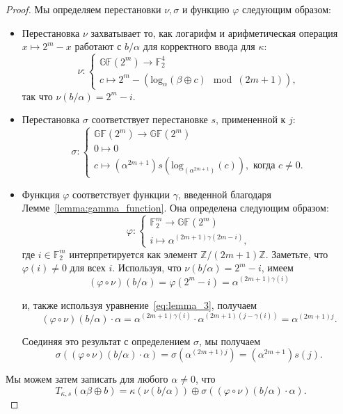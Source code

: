 \begin{proof}
Мы определяем перестановки \(\nu, \sigma\) и функцию \(\varphi\) следующим образом:

\begin{itemize}
  \item Перестановка \(\nu\) захватывает то, как логарифм и арифметическая операция \(x \mapsto 2^m - x\) работают с \(b/\alpha\) для корректного ввода для \(\kappa\):
  \[
  \nu :
  \begin{cases}
  \mathbb{GF}(2^m) \to \mathbb{F}^4_2 \\
  c \mapsto 2^m - (\mathrm{log}_{\alpha}(\beta \oplus c) \mod (2m + 1)),
  \end{cases}
  \]
  так что \(\nu(b/\alpha) = 2^m - i\).

  \item Перестановка \(\sigma\) соответствует перестановке \(s\), примененной к \(j\):
  \[
  \sigma :
  \begin{cases}
  \mathbb{GF}(2^m) \to \mathbb{GF}(2^m) \\
  0 \mapsto 0 \\
  c \mapsto (\alpha^{2m+1}) s(\mathrm{log}_{(\alpha^{2m+1})}(c)), \text{ когда } c \neq 0.
  \end{cases}
  \]

  \item Функция \(\varphi\) соответствует функции \(\gamma\), введенной благодаря Лемме~\ref{lemma:gamma_function}. Она определена следующим образом:
  \[
  \varphi :
  \begin{cases}
  \mathbb{F}^m_2 \to \mathbb{GF}(2^m) \\
  i \mapsto \alpha^{(2m+1)\gamma(2m-i)},
  \end{cases}
  \]
  где \(i \in \mathbb{F}^m_2\) интерпретируется как элемент \(\mathbb{Z}/(2m + 1)\mathbb{Z}\). Заметьте, что \(\varphi(i) \neq 0\) для всех \(i\). Используя, что \(\nu(b/\alpha) = 2^m - i\), имеем
  \[
  (\varphi \circ \nu)(b/\alpha) = \varphi(2^m - i) = \alpha^{(2m+1)\gamma(i)}
  \]

  и, также используя уравнение~\ref{eq:lemma_3}, получаем
  \[
  (\varphi \circ \nu)(b/\alpha) \cdot \alpha = \alpha^{(2m+1)\gamma(i)} \cdot \alpha^{(2m+1)(j-\gamma(i))} = \alpha^{(2m+1)j}.
  \]

  Соединяя это результат с определением \(\sigma\), мы получаем
  \[
  \sigma((\varphi \circ \nu)(b/\alpha) \cdot \alpha) = \sigma(\alpha^{(2m+1)j}) = (\alpha^{2m+1}) s(j).
  \]

\end{itemize}
Мы можем затем записать для любого \(\alpha \neq 0\), что
\[
T_{\kappa, s}(\alpha \beta \oplus b) = \kappa(\nu(b/\alpha)) \oplus \sigma((\varphi \circ \nu)(b/\alpha) \cdot \alpha).
\]


\end{proof}

